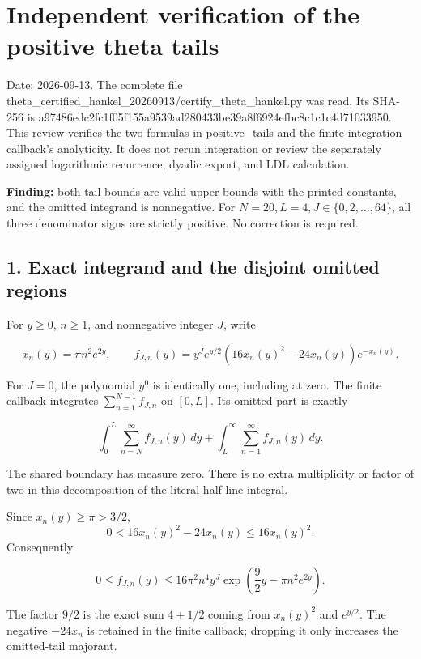 \section{Independent verification of the positive theta tails}\label{independent-verification-of-the-positive-theta-tails}

Date: 2026-09-13. The complete file theta\_certified\_hankel\_20260913/certify\_theta\_hankel.py was read. Its SHA-256 is a97486edc2fc1f05f155a9539ad280433be39a8f6924efbc8c1c1c4d71033950. This review verifies the two formulas in positive\_tails and the finite integration callback's analyticity. It does not rerun integration or review the separately assigned logarithmic recurrence, dyadic export, and LDL calculation.

\textbf{Finding:} both tail bounds are valid upper bounds with the printed constants, and the omitted integrand is nonnegative. For \(N=20,L=4,J\in\{0,2,\ldots,64\}\), all three denominator signs are strictly positive. No correction is required.

\subsection{1. Exact integrand and the disjoint omitted regions}\label{exact-integrand-and-the-disjoint-omitted-regions}

For \(y\ge0\), \(n\ge1\), and nonnegative integer \(J\), write

\[
x_n(y)=\pi n^2e^{2y},\qquad
f_{J,n}(y)=y^Je^{y/2}(16x_n(y)^2-24x_n(y))e^{-x_n(y)}.
\tag{TT1}
\]

For \(J=0\), the polynomial \(y^0\) is identically one, including at zero. The finite callback integrates \(\sum_{n=1}^{N-1}f_{J,n}\) on \([0,L]\). Its omitted part is exactly

\[
\int_0^L\sum_{n=N}^{\infty}f_{J,n}(y)\,dy
+\int_L^\infty\sum_{n=1}^{\infty}f_{J,n}(y)\,dy.
\tag{TT2}
\]

The shared boundary has measure zero. There is no extra multiplicity or factor of two in this decomposition of the literal half-line integral.

Since \(x_n(y)\ge\pi>3/2\), \[
0<16x_n(y)^2-24x_n(y)\le16x_n(y)^2.
\] Consequently

\[
0\le f_{J,n}(y)
\le16\pi^2 n^4 y^J
\exp\!\left(\frac92y-\pi n^2e^{2y}\right).
\tag{TT3}
\]

The factor \(9/2\) is the exact sum \(4+1/2\) coming from \(x_n(y)^2\) and \(e^{y/2}\). The negative \(-24x_n\) is retained in the finite callback; dropping it only increases the omitted-tail majorant.

